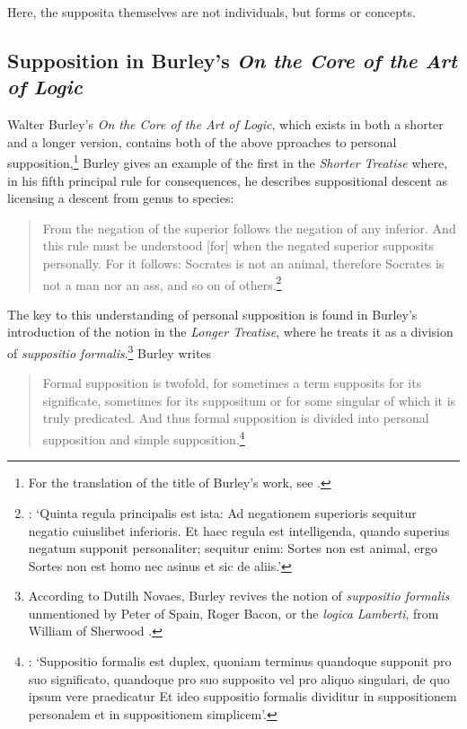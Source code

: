 \documentclass[a4paper, 11pt]{article}
\begin{document}
Here, the supposita themselves are not individuals, but forms or concepts.

\subsection{Supposition in Burley's \emph{On the Core of the Art of Logic}}
Walter Burley's \emph{On the Core of the Art of Logic}, which exists in both a shorter and a longer version, contains both of the above pproaches to personal supposition,\footnote{For the translation of the title of Burley's work, see \autocite{SpadeMenn}.} Burley gives an example of the first in the \emph{Shorter Treatise} where, in his fifth principal rule for consequences, he describes suppositional descent as licensing a descent from genus to species:

\begin{quote}
From the negation of the superior follows the negation of any inferior. And this rule must be understood [for] when the negated superior supposits personally. For it follows: Socrates is not an animal, therefore Socrates is not a man nor an ass, and so on of others.\footnote{\autocite[209.35-210.2]{BurleyDPAL}: `Quinta regula principalis est ista: Ad negationem superioris sequitur negatio cuiuslibet inferioris. Et haec regula est intelligenda, quando superius negatum supponit personaliter; sequitur enim: Sortes non est animal, ergo Sortes non est homo nec asinus et sic de aliis.'}
\end{quote} 
The key to this understanding of personal supposition is found in Burley's introduction of the notion in the \emph{Longer Treatise}, where he treats it as a division of \emph{suppositio formalis}.\footnote{According to Dutilh Novaes, Burley revives the notion of \emph{suppositio formalis} unmentioned by Peter of Spain, Roger Bacon, or the \emph{logica Lamberti}, from William of Sherwood \autocite[360]{DutilhNovaes2012c}.} Burley writes
\begin{quote}
Formal supposition is twofold, for sometimes a term supposits for its significate, sometimes for its suppositum or for some singular of which it is truly predicated. And thus formal supposition is divided into personal supposition and simple supposition.\footnote{\autocite[3.1-5]{BurleyDPAL}: `Suppositio formalis est duplex, quoniam terminus quandoque supponit pro suo significato, quandoque pro suo supposito vel pro aliquo singulari, de quo ipsum vere praedicatur Et ideo suppositio formalis dividitur in suppositionem personalem et in suppositionem simplicem'.}
\end{quote}
\end{document}
